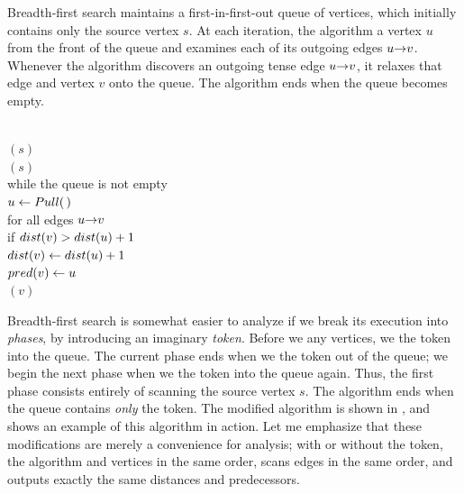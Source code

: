 Breadth-first search maintains a first-in-first-out queue of vertices, which initially contains only the source vertex $s$.
At each iteration, the algorithm  a vertex $u$ from the front of the queue and examines each of its outgoing edges $u\mathord{\rightarrow}v$.
Whenever the algorithm discovers an outgoing tense edge $u\mathord{\rightarrow}v$, it relaxes that edge and  vertex $v$ onto the queue.
The algorithm ends when the queue becomes empty.

\begin{pseudocode}
\\
$(s)$\\
$(s)$\\
while the queue is not empty\\
\Indent $u \gets Pull(\,)$\\
\Indent for all edges $u\mathord{\rightarrow}v$\\
\Indent\Indent if $dist(v) > dist(u) + 1$ \\
\Indent\Indent\Indent $dist(v) \gets dist(u) + 1$ \\
\Indent\Indent\Indent $pred(v) \gets u$\\
\Indent\Indent\Indent {}$(v)$
\end{pseudocode}

Breadth-first search is somewhat easier to analyze if we break its execution into \textit{phases}, by introducing an imaginary \textit{token}.
Before we  any vertices, we  the token into the queue.
The current phase ends when we  the token out of the queue; we begin the next phase when we  the token into the queue again.
Thus, the first phase consists entirely of scanning the source vertex $s$.
The algorithm ends when the queue contains \textit{only} the token.
The modified algorithm is shown in , and  shows an example of this algorithm in action.
Let me emphasize that these modifications are merely a convenience for analysis; with or without the token, the algorithm  and  vertices in the same order, scans edges in the same order, and outputs exactly the same distances and predecessors.


